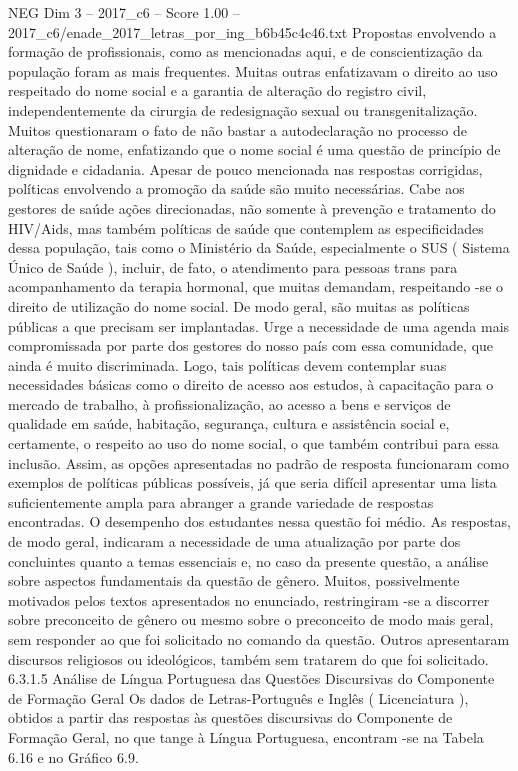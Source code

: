 \begin{textsample}{NEG Dim 3 – 2017\_c6 – Score 1.00 – 2017\_c6/enade\_2017\_letras\_por\_ing\_b6b45c4c46.txt}
Propostas envolvendo a formação de profissionais, como as mencionadas aqui, e de conscientização da população foram as mais frequentes.
Muitas outras enfatizavam o direito ao uso respeitado do nome social e a garantia de alteração do registro civil, independentemente da cirurgia de redesignação sexual ou transgenitalização.
Muitos questionaram o fato de não bastar a autodeclaração no processo de alteração de nome, enfatizando que o nome social é uma questão de princípio de dignidade e cidadania.
Apesar de pouco mencionada nas respostas corrigidas, políticas envolvendo a promoção da saúde são muito necessárias.
Cabe aos gestores de saúde ações direcionadas, não somente à prevenção e tratamento do HIV/Aids, mas também políticas de saúde que contemplem as especificidades dessa população, tais como o Ministério da Saúde, especialmente o SUS ( Sistema Único de Saúde ), incluir, de fato, o atendimento para pessoas trans para acompanhamento da terapia hormonal, que muitas demandam, respeitando -se o direito de utilização do nome social.
De modo geral, são muitas as políticas públicas a que precisam ser implantadas.
Urge a necessidade de uma agenda mais compromissada por parte dos gestores do nosso país com essa comunidade, que ainda é muito discriminada.
Logo, tais políticas devem contemplar suas necessidades básicas como o direito de acesso aos estudos, à capacitação para o mercado de trabalho, à profissionalização, ao acesso a bens e serviços de qualidade em saúde, habitação, segurança, cultura e assistência social e, certamente, o respeito ao uso do nome social, o que também contribui para essa inclusão.
Assim, as opções apresentadas no padrão de resposta funcionaram como exemplos de políticas públicas possíveis, já que seria difícil apresentar uma lista suficientemente ampla para abranger a grande variedade de respostas encontradas.
O desempenho dos estudantes nessa questão foi médio.
As respostas, de modo geral, indicaram a necessidade de uma atualização por parte dos concluintes quanto a temas essenciais e, no caso da presente questão, a análise sobre aspectos fundamentais da questão de gênero.
Muitos, possivelmente motivados pelos textos apresentados no enunciado, restringiram -se a discorrer sobre preconceito de gênero ou mesmo sobre o preconceito de modo mais geral, sem responder ao que foi solicitado no comando da questão.
Outros apresentaram discursos religiosos ou ideológicos, também sem tratarem do que foi solicitado. 6.3.1.5 Análise de Língua Portuguesa das Questões Discursivas do Componente de Formação Geral Os dados de Letras-Português e Inglês ( Licenciatura ), obtidos a partir das respostas às questões discursivas do Componente de Formação Geral, no que tange à Língua Portuguesa, encontram -se na Tabela 6.16 e no Gráfico 6.9.

\end{textsample}
